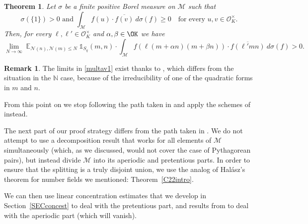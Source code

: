 \documentclass[11pt]{amsart}
\newtheorem{theorem}[lemma]{Theorem}
\theoremstyle{definition}
\newtheorem*{remark}{Remark}
\DeclareMathOperator*{\E}{\mathbb{E}}
\newcommand{\N}{{\mathbb N}}
\newcommand{\NN}{{\mathcal N}}
\newcommand{\AK}[1]{{\color{ForestGreen}{{#1}}}}
\begin{document}
{\begin{theorem}\label{secondreduction}
Let $\sigma$ be a finite positive Borel measure on $\mathcal{M}$ such that 
\begin{equation}\label{positivitymeasures}
    \text{$\sigma(\{1\})>0$ and } \int_{\mathcal{M}} f(u)\cdot \overline{f(v)} \ d\sigma(f)\geq 0 \quad \text{for every } u, v \in \mathcal{O}_K^{\times}.  
\end{equation}
Then, for every $\ell, \ell' \in \mathcal{O}_K^{\times}$ and $\alpha, \beta \in \OK$ we have
\begin{equation}\label{multav1}
    \lim_{N \to \infty} \E_{\NN(n),\NN(m) \leq N}\mathds{1}_{S_q}(m,n)\cdot\int_{\mathcal{M}}  f(\ell (m+\alpha n)(m+\beta n)) \cdot \overline{f(\ell' mn)}\ d\sigma(f)>0.
\end{equation}
\end{theorem}
\begin{remark}
The limits in \eqref{multav1} exist thanks to \cite[Theorem~1.12]{S23}, which differs from the situation in the $\N$ case, because of the irreducibility of one of the quadratic forms in $m$ and $n$.
\end{remark}

From this point on we stop following the  path taken in \cite{S23} and apply the schemes of \cite{FKM2,FKM1} instead.
 

}
\fi


The next part of our proof strategy differs from the path taken in \cite{S23}. We do not attempt to use a decomposition result that works for all elements of $\mathcal{M}$ simultaneously (which, as we discussed, would not cover the case of Pythagorean pairs), but instead divide $\mathcal{M}$ into its aperiodic and pretentious parts. In order to ensure that the splitting is a truly disjoint union, we use the analog of Hal\'asz's theorem for number fields we mentioned: Theorem~\ref{C22intro}. 

We can then use linear concentration estimates that we develop in Section~\ref{SECconcest} to deal with the pretentious part, and results from \cite{S23} to deal with the aperiodic part (which will vanish).
\end{document}
